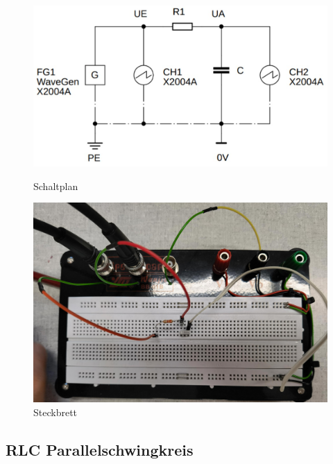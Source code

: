 \documentclass[12pt,a4paper,twoside]{article}
\begin{document}
\begin{figure}[H]
    \begin{minipage}[b]{.5\linewidth} %
        \includegraphics[width=1\linewidth]{nudes/Aufgabe 2 schaltplan.jpg}
        \caption{Schaltplan }
        \label{fig:a2s}
    \end{minipage}
    \hspace{0.01\linewidth}%
    \begin{minipage}[b]{.5\linewidth} %
        \includegraphics[width=1\linewidth]{nudes/a2 brett.jpg}
    \caption{Steckbrett}
    \label{fig:a2b}
    \end{minipage}
\end{figure}


\subsection{RLC Parallelschwingkreis}
\end{document}
